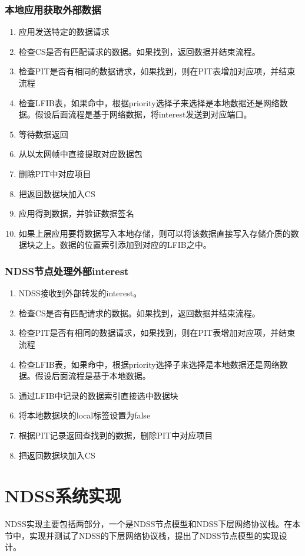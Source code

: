 \subsubsection{本地应用获取外部数据}
\begin{enumerate}[step 1.]
\item 应用发送特定的数据请求
\item 检查CS是否有匹配请求的数据。如果找到，返回数据并结束流程。
\item 检查PIT是否有相同的数据请求，如果找到，则在PIT表增加对应项，并结束流程
\item 检查LFIB表，如果命中，根据priority选择子来选择是本地数据还是网络数据。假设后面流程是基于网络数据，将interest发送到对应端口。
\item 等待数据返回
\item 从以太网帧中直接提取对应数据包
\item 删除PIT中对应项目
\item 把返回数据块加入CS
\item 应用得到数据，并验证数据签名
\item 如果上层应用要将数据写入本地存储，则可以将该数据直接写入存储介质的数据块之上。数据的位置索引添加到对应的LFIB之中。
\end{enumerate}

\subsubsection{NDSS节点处理外部interest}
\begin{enumerate}[step 1.]
\item NDSS接收到外部转发的interest。
\item 检查CS是否有匹配请求的数据。如果找到，返回数据并结束流程。
\item 检查PIT是否有相同的数据请求，如果找到，则在PIT表增加对应项，并结束流程
\item 检查LFIB表，如果命中，根据priority选择子来选择是本地数据还是网络数据。假设后面流程是基于本地数据。
\item 通过LFIB中记录的数据索引直接选中数据块
\item 将本地数据块的local标签设置为false
\item 根据PIT记录返回查找到的数据，删除PIT中对应项目
\item 把返回数据块加入CS
\end{enumerate}

\section{NDSS系统实现}
NDSS实现主要包括两部分，一个是NDSS节点模型和NDSS下层网络协议栈。在本节中，实现并测试了NDSS的下层网络协议栈，提出了NDSS节点模型的实现设计。


